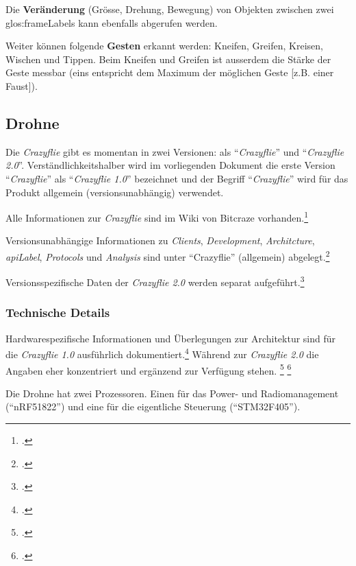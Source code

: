 Die \textbf{Veränderung} (Grösse, Drehung, Bewegung) von Objekten zwischen zwei \glspl{glos:frameLabel} kann ebenfalls abgerufen werden.

Weiter können folgende \textbf{Gesten} erkannt werden: Kneifen, Greifen, Kreisen, Wischen und Tippen.
Beim Kneifen und Greifen ist ausserdem die Stärke der Geste messbar (eins entspricht dem Maximum der möglichen Geste [z.B. einer Faust]).

\subsection{Drohne}
Die \textit{Crazyflie} gibt es momentan in zwei Versionen: als "`\textit{Crazyflie}"' und "`\textit{Crazyflie 2.0}"'. Verständlichkeitshalber wird im vorliegenden Dokument die erste Version "`\textit{Crazyflie}"' als "`\textit{Crazyflie 1.0}"' bezeichnet und der Begriff "`\textit{Crazyflie}"' wird für das Produkt allgemein (versionsunabhängig) verwendet.

Alle Informationen zur \textit{Crazyflie} sind im Wiki von Bitcraze vorhanden.\footcite{index_Bitcraze_Wiki_2015-03-29}

Versionsunabhängige Informationen zu  \textit{Clients}, \textit{Development}, \textit{Architcture}, \textit{\gls{apiLabel}}, \textit{Protocols} und \textit{Analysis} sind unter "`Crazyflie"' (allgemein) abgelegt.\footcite{doc_crazyflie_index_Bitcraze_Wiki_2015-03-29}

Versionsspezifische Daten der \textit{Crazyflie 2.0} werden separat aufgeführt.\footcite{projects_crazyflie2_index_Bitcraze_Wiki_2015-03-29}

\subsubsection{Technische Details}
Hardwarespezifische Informationen und Überlegungen zur Architektur sind für die \textit{Crazyflie 1.0} ausführlich dokumentiert.\footcite{projects_crazyflie_hardware_explained_Bitcraze_Wiki_2015-03-29}
Während zur \textit{Crazyflie 2.0} die Angaben eher konzentriert und ergänzend zur Verfügung stehen.
\footcite{projects_crazyflie2_architecture_index_Bitcraze_Wiki_2015-03-29}
\footcite{projects_crazyflie2_hardware_specification_Bitcraze_Wiki_2015-03-29}

Die Drohne hat zwei Prozessoren. Einen für das Power- und Radiomanagement ("`nRF51822"') und eine für die eigentliche Steuerung ("`STM32F405"').

